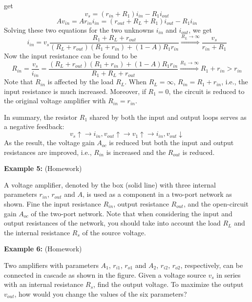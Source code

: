 \begin{itemize}
\begin{itemize}
  get
  \[ v_s=(r_{in}+R_1) i_{in}-R_1 i_{out} \]
  \[ A v_{in}=Ar_{in}i_{in}=(r_{out}+R_L+R_1)i_{out}-R_1i_{in} \]
  Solving these two equations for the two unknowns $i_{in}$ and $i_{out}$,
  we get
  \[ i_{in}=v_s \frac{R_1+R_L+r_{out}}{(R_L+r_{out})(R_1+r_{in})+(1-A)R_1r_{in}}
  \stackrel{R_L\rightarrow \infty}{\Longrightarrow} \frac{v_s}{r_{in}+R_1} \]
  Now the input resistance can be found to be
  \[ R_{in}=\frac{v_s}{i_{in}}=\frac{(R_L+r_{out})(R_1+r_{in})+(1-A)R_1r_{in}}{R_1+R_L+r_{out}}
  \stackrel{R_L\rightarrow \infty}{\Longrightarrow} R_1+r_{in}>r_{in} \]  
  Note that $R_{in}$ is affected by the load $R_L$. When $R_L=\infty$,
  $R_{in}=R_1+r_{in}$, i.e., the input resistance is much increased. 
  Moreover, if $R_1=0$, the circuit is reduced to the original voltage 
  amplifier with $R_{in}=r_{in}$.
\end{itemize}
In summary, the resistor $R_1$ shared by both the input and output loops
serves as a negative feedback:
\[ v_s\uparrow \rightarrow i_{in}, v_{out}\uparrow \rightarrow v_1\uparrow 
\rightarrow i_{in}, v_{out}\downarrow \]
As the result, the voltage gain $A_{oc}$ is reduced but both the input and
output resistances are improved, i.e., $R_{in}$ is increased and the $R_{out}$
is reduced.

{\bf Example 5:} (Homework)


A voltage amplifier, denoted by the box (solid line) with three internal 
parameters $r_{in}$, $r_{out}$ and $A$, is used as a component in a two-port
network as shown. Fine the input resistance $R_{in}$, output resistance 
$R_{out}$, and the open-circuit gain $A_{oc}$ of the two-port network.
Note that when considering the input and output resistances of the network,
you should take into account the load $R_L$ and the internal resistance $R_s$
of the source voltage.


{\bf Example 6:} (Homework)


Two amplifiers with parameters $A_1$, $r_{i1}$, $r_{o1}$ and $A_2$, $r_{i2}$, 
$r_{o2}$, respectively, can be connected in cascade as shown in the figure. 
Given a voltage source $v_s$ in series with an internal resistance $R_s$,
find the output voltage. To maximize the output $v_{out}$, how would you 
change the values of the six parameters?


\end{itemize}
